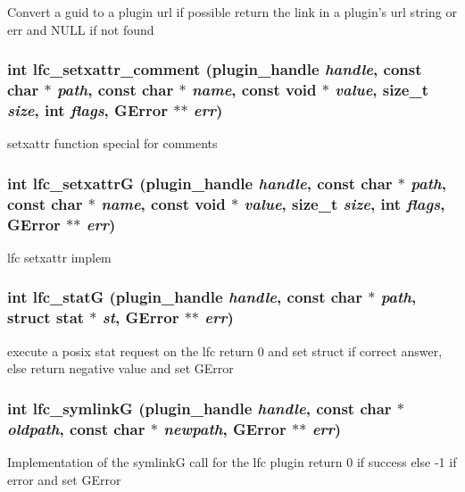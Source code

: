 Convert a guid to a plugin url if possible return the link in a plugin's url string or err and NULL if not found 
\subsubsection{\setlength{\rightskip}{0pt plus 5cm}int lfc\_\-setxattr\_\-comment (plugin\_\-handle {\em handle}, const char $\ast$ {\em path}, const char $\ast$ {\em name}, const void $\ast$ {\em value}, size\_\-t {\em size}, int {\em flags}, GError $\ast$$\ast$ {\em err})}\label{gfal__common__lfc_8c_08bd87b3857f5a147b6defda0c61c5e4}


setxattr function special for comments 
\subsubsection{\setlength{\rightskip}{0pt plus 5cm}int lfc\_\-setxattr\-G (plugin\_\-handle {\em handle}, const char $\ast$ {\em path}, const char $\ast$ {\em name}, const void $\ast$ {\em value}, size\_\-t {\em size}, int {\em flags}, GError $\ast$$\ast$ {\em err})}\label{gfal__common__lfc_8c_678da8773fc09be4050e03a4a21eadf9}


lfc setxattr implem 
\subsubsection{\setlength{\rightskip}{0pt plus 5cm}int lfc\_\-stat\-G (plugin\_\-handle {\em handle}, const char $\ast$ {\em path}, struct stat $\ast$ {\em st}, GError $\ast$$\ast$ {\em err})}\label{gfal__common__lfc_8c_ab708b142708ecaa8283d0a996a4dd32}


execute a posix stat request on the lfc return 0 and set struct if correct answer, else return negative value and set GError 
\subsubsection{\setlength{\rightskip}{0pt plus 5cm}int lfc\_\-symlink\-G (plugin\_\-handle {\em handle}, const char $\ast$ {\em oldpath}, const char $\ast$ {\em newpath}, GError $\ast$$\ast$ {\em err})}\label{gfal__common__lfc_8c_5d1f7f46eb2843996cf95fd020086675}


Implementation of the symlink\-G call for the lfc plugin return 0 if success else -1 if error and set GError 